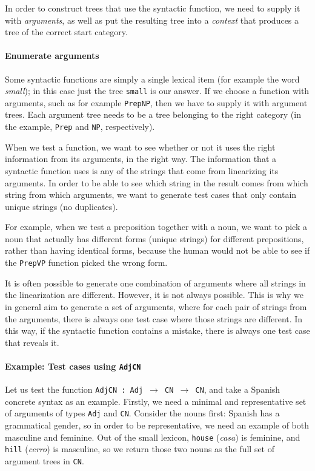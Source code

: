 \documentclass[11pt]{article}
\def\t#1{\texttt{#1}}
\begin{document}
In order to construct trees that use the syntactic function, we need to supply it with \emph{arguments}, as well as put the resulting tree into a \emph{context} that produces a tree of the correct start category.

\paragraph{Enumerate arguments} Some syntactic functions are simply a single lexical item (for example the word \emph{small}); in this case just the tree \t{small} is our answer. If we choose a function with arguments, such as for example \t{PrepNP}, then we have to supply it with argument trees. Each argument tree needs to be a tree belonging to the right category (in the example, \t{Prep} and \t{NP}, respectively).

When we test a function, we want to see whether or not it uses the right information from its arguments, in the right way. The information that a syntactic function uses is any of the strings that come from linearizing its arguments. In order to be able to see which string in the result comes from which string from which arguments, we want to generate test cases that only contain unique strings (no duplicates).

For example, when we test a preposition together with a noun, we want to pick a noun that actually has different forms (unique strings) for different prepositions, rather than having identical forms, because the human would not be able to see if the \t{PrepVP} function picked the wrong form.

It is often possible to generate one combination of arguments where all strings in the linearization are different. However, it is not always possible. This is why we in general aim to generate a set of arguments, where for each pair of strings from the arguments, there is always one test case where those strings are different. In this way, if the syntactic function contains a mistake, there is always one test case that reveals it.

\paragraph{Example: Test cases using \t{AdjCN}} Let us test the function
\t{AdjCN : Adj $\rightarrow$ CN $\rightarrow$ CN}, and take a Spanish
concrete syntax as an example. 
Firstly, we need a minimal and representative set of arguments of types
\t{Adj} and \t{CN}. Consider the nouns first: Spanish has a
grammatical gender, so in order to be representative, we need an
example of both masculine and feminine. Out of the small lexicon,
\t{house} (\emph{casa}) is feminine, and \t{hill} (\emph{cerro}) is
masculine, so we return those two nouns as the full set of argument
trees in \t{CN}. 
\end{document}
